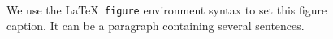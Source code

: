 
\newpage



\begin{figure}
\caption{We use the \LaTeX\ {\tt figure} environment syntax to set this
figure caption.  It can be a paragraph containing several sentences.}
\end{figure}

